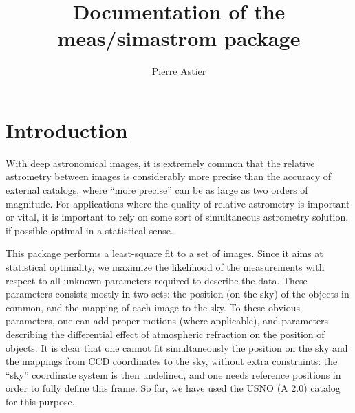 \documentclass[a4paper,12pt]{scrartcl}
\title{Documentation of the meas/simastrom package}
\author{Pierre Astier}
\affil{LPNHE/IN2P3/CNRS (Paris)}
\begin{document}
\maketitle




\tableofcontents

\section{Introduction}
With deep astronomical images, it is extremely common that
the relative astrometry between images is considerably more precise
than the accuracy of external catalogs, where ``more precise'' can be as large
as two orders of magnitude. For applications where the
quality of relative astrometry is important or vital, it is important
to rely on some sort of simultaneous astrometry solution, if possible
optimal in a statistical sense. 

This package performs a least-square fit to a set of images.
Since it aims at statistical optimality, we maximize 
the likelihood of the measurements with respect to all 
unknown parameters required to describe the data.
These parameters consists mostly in two sets: the position
(on the sky) of the objects in common, and the mapping
of each image to the sky. To these obvious parameters,
one can add proper motions (where applicable), and 
parameters describing the differential effect of atmospheric refraction
on the position of objects. It is clear that one cannot
fit simultaneously the position on the sky and the mappings
from CCD coordinates to the sky, without extra constraints:
the ``sky'' coordinate system is then undefined, and one needs
reference positions in order to fully define this frame.
So far, we have used the USNO (A 2.0) catalog for this purpose.
\end{document}
